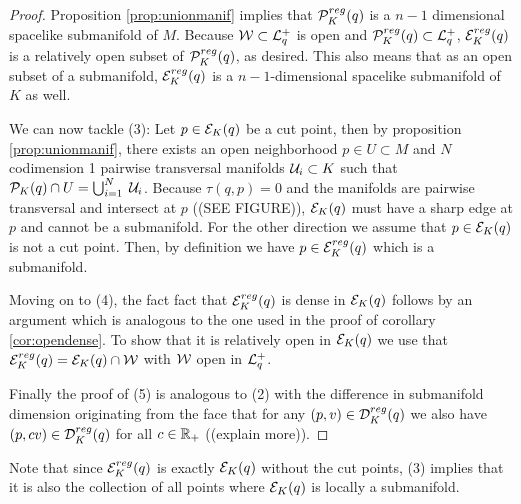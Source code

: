 \begin{proof}
Proposition \ref{prop:unionmanif} implies that ${\mathcal{P}}^{reg}_K(q)$ is a $n-1$ dimensional spacelike submanifold of $M$. Because ${\mathcal{W}}\subset {\mathcal{L}}^+_q$ is open and ${\mathcal{P}}^{reg}_K(q)\subset {\mathcal{L}}^+_q$, ${\mathcal{E}}^{reg}_K(q)$ is a relatively open subset of ${\mathcal{P}}^{reg}_K(q)$, as desired. This also means that as an open subset of a submanifold, ${\mathcal{E}}^{reg}_K(q)$ is a $n-1$-dimensional spacelike submanifold of $K$ as well.

We can now tackle (3): 
Let $p\in {\mathcal{E}}_K(q)$ be a cut point, then by proposition \ref{prop:unionmanif}, there exists an open neighborhood $p\in U \subset M$ and $N$ codimension 1 pairwise transversal manifolds $\mathcal{U}_i\subset K$ such that ${\mathcal{P}}_K(q)\cap U = \bigcup_{i=1}^N \; \mathcal{U}_i$. Because $\tau(q,p)=0$ and the manifolds are pairwise transversal and intersect at $p$ ((SEE FIGURE)), ${\mathcal{E}}_K(q)$ must have a sharp edge at $p$ and cannot be a submanifold. For the other direction we assume that $p\in {\mathcal{E}}_K(q)$ is not a cut point. Then, by definition we have $p\in {\mathcal{E}}^{reg}_K(q)$ which is a submanifold.

Moving on to (4), the fact fact that ${\mathcal{E}}^{reg}_K(q)$ is dense in  ${\mathcal{E}}_K(q)$ follows by an argument which is analogous to the one used in the proof of corollary \ref{cor:opendense}. To show that it is relatively open in ${\mathcal{E}}_K(q)$ we use that ${\mathcal{E}}^{reg}_K(q) = {\mathcal{E}}_K(q) \cap {\mathcal{W}}$ with ${\mathcal{W}}$ open in ${\mathcal{L}}^+_q$.

Finally the proof of (5) is analogous to (2) with the difference in submanifold dimension originating from the face that for any $(p,v)\in {\mathcal{D}}^{reg}_K(q)$ we also have $(p,cv)\in {\mathcal{D}}^{reg}_K(q)$ for all $c\in \mathbb{R}_+$ ((explain more)).
\end{proof}

Note that since ${\mathcal{E}}^{reg}_K(q)$ is exactly ${\mathcal{E}}_K(q)$ without the cut points, (3) implies that it is also the collection of all points where ${\mathcal{E}}_K(q)$ is locally a submanifold.

